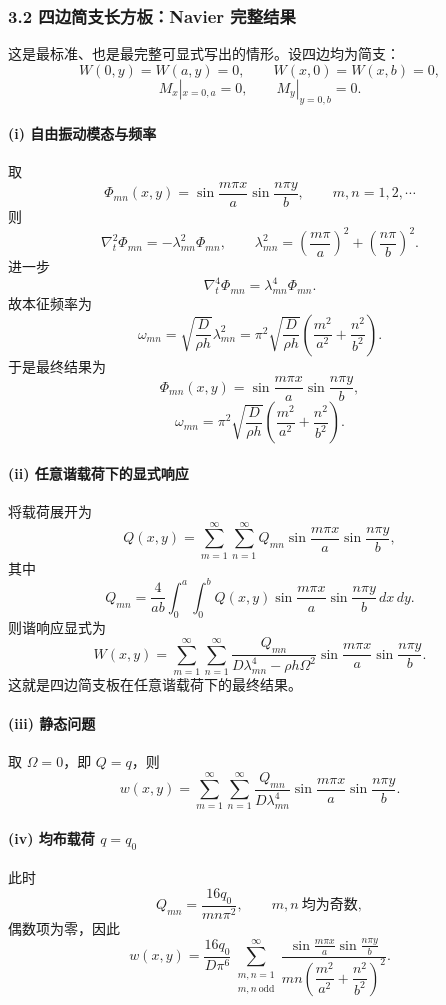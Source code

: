 \documentclass[12pt]{ctexart}
\begin{document}
\subsubsection*{3.2 四边简支长方板：Navier 完整结果}
这是最标准、也是最完整可显式写出的情形。设四边均为简支：
\[
W(0,y)=W(a,y)=0,\qquad W(x,0)=W(x,b)=0,
\]
\[
M_x|_{x=0,a}=0,\qquad M_y|_{y=0,b}=0.
\]

\paragraph{(i) 自由振动模态与频率}
取
\[
\Phi_{mn}(x,y)=\sin\frac{m\pi x}{a}\sin\frac{n\pi y}{b},
\qquad m,n=1,2,\cdots
\]
则
\[
\nabla_t^2 \Phi_{mn}
=
-\lambda_{mn}^2 \Phi_{mn},
\qquad
\lambda_{mn}^2=
\left(\frac{m\pi}{a}\right)^2+\left(\frac{n\pi}{b}\right)^2.
\]
进一步
\[
\nabla_t^4 \Phi_{mn}=\lambda_{mn}^4 \Phi_{mn}.
\]
故本征频率为
\[
\omega_{mn}
=
\sqrt{\frac{D}{\rho h}}\lambda_{mn}^2
=
\pi^2\sqrt{\frac{D}{\rho h}}
\left(
\frac{m^2}{a^2}+\frac{n^2}{b^2}
\right).
\]
于是最终结果为
\[
\Phi_{mn}(x,y)=\sin\frac{m\pi x}{a}\sin\frac{n\pi y}{b},
\]
\[
\omega_{mn}
=
\pi^2\sqrt{\frac{D}{\rho h}}
\left(
\frac{m^2}{a^2}+\frac{n^2}{b^2}
\right).
\]

\paragraph{(ii) 任意谐载荷下的显式响应}
将载荷展开为
\[
Q(x,y)=\sum_{m=1}^\infty\sum_{n=1}^\infty Q_{mn}
\sin\frac{m\pi x}{a}\sin\frac{n\pi y}{b},
\]
其中
\[
Q_{mn}
=
\frac{4}{ab}\int_0^a\int_0^b
Q(x,y)\sin\frac{m\pi x}{a}\sin\frac{n\pi y}{b}\, dx\,dy.
\]
则谐响应显式为
\[
W(x,y)=
\sum_{m=1}^\infty\sum_{n=1}^\infty
\frac{Q_{mn}}{D\lambda_{mn}^4-\rho h \Omega^2}
\sin\frac{m\pi x}{a}\sin\frac{n\pi y}{b}.
\]
这就是四边简支板在任意谐载荷下的最终结果。

\paragraph{(iii) 静态问题}
取 \(\Omega=0\)，即 \(Q=q\)，则
\[
w(x,y)=
\sum_{m=1}^\infty\sum_{n=1}^\infty
\frac{Q_{mn}}{D\lambda_{mn}^4}
\sin\frac{m\pi x}{a}\sin\frac{n\pi y}{b}.
\]

\paragraph{(iv) 均布载荷 \(q=q_0\)}
此时
\[
Q_{mn}
=
\frac{16q_0}{mn\pi^2},
\qquad m,n\ \text{均为奇数},
\]
偶数项为零，因此
\[
w(x,y)=
\frac{16q_0}{D\pi^6}
\sum_{\substack{m,n=1\\ m,n\ \text{odd}}}^{\infty}
\frac{
\sin\frac{m\pi x}{a}\sin\frac{n\pi y}{b}
}{
mn\left(\dfrac{m^2}{a^2}+\dfrac{n^2}{b^2}\right)^2
}.
\]
\end{document}
